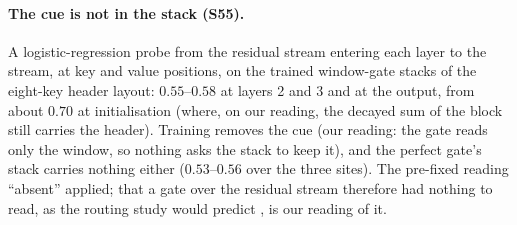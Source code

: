 \documentclass[11pt]{article}
\begin{document}
\paragraph{The cue is not in the stack (S55).} A logistic-regression probe from the residual stream entering each layer to the stream, at key and value positions, on the trained window-gate stacks of the eight-key header layout: $0.55$--$0.58$ at layers 2 and 3 and at the output, from about $0.70$ at initialisation (where, on our reading, the decayed sum of the block still carries the header). Training removes the cue (our reading: the gate reads only the window, so nothing asks the stack to keep it), and the perfect gate's stack carries nothing either ($0.53$--$0.56$ over the three sites). The pre-fixed reading ``absent'' applied; that a gate over the residual stream therefore had nothing to read, as the routing study would predict \cite{routing}, is our reading of it.
\end{document}
